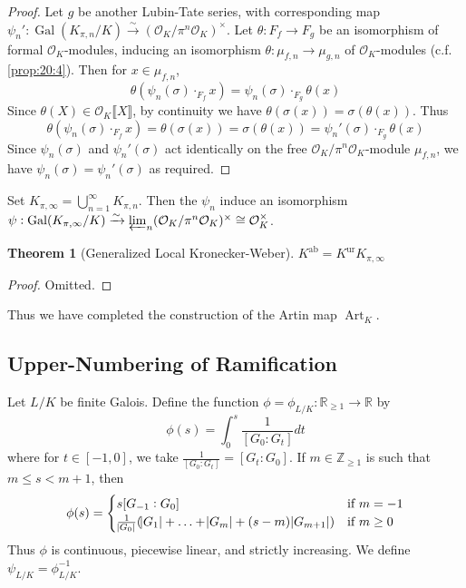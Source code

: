 \documentclass[11pt]{article}
\theoremstyle{definition}
\theoremstyle{plain}
\newtheorem{theorem}[definition]{Theorem}
\theoremstyle{remark}
\DeclareMathOperator{\Gal}{Gal}
\DeclareMathOperator{\Art}{Art}
\newcommand{\ZZ}{\mathbb{Z}}
\newcommand{\RR}{\mathbb{R}}
\newcommand{\cO}{\mathcal{O}}
\newcommand{\ab}{\mathrm{ab}}
\newcommand{\ur}{\mathrm{ur}}
\begin{document}
\begin{proof}
    Let $g$ be another Lubin-Tate series, with corresponding map $\psi_n' : \Gal(K_{\pi,n}/K) \xrightarrow{\sim} (\cO_K / \pi^n \cO_K)^\times$. Let $\theta : F_f \to F_g$ be an isomorphism of formal $\cO_K$-modules, inducing an isomorphism $\theta : \mu_{f,n} \to \mu_{g,n}$ of $\cO_K$-modules (c.f. \autoref{prop:20:4}). Then for $x \in \mu_{f,n}$,
    \begin{equation*}
        \theta(\psi_n(\sigma) \cdot_{F_f} x) = \psi_n(\sigma) \cdot_{F_g} \theta(x)
    \end{equation*}
    Since $\theta(X) \in \cO_K \llbracket X \rrbracket$, by continuity we have $\theta(\sigma(x)) = \sigma(\theta(x))$. Thus
    \begin{equation*}
        \theta(\psi_n(\sigma) \cdot_{F_f} x) = \theta(\sigma(x)) = \sigma(\theta(x)) = \psi_n'(\sigma) \cdot_{F_g} \theta(x)
    \end{equation*}
    Since $\psi_n(\sigma)$ and $\psi_n'(\sigma)$ act identically on the free $\cO_K / \pi^n \cO_K$-module $\mu_{f,n}$, we have $\psi_n(\sigma) = \psi_n'(\sigma)$ as required.
\end{proof}

Set $K_{\pi, \infty} = \bigcup_{n=1}^\infty K_{\pi,n}$. Then the $\psi_n$ induce an isomorphism $\psi : \Gal(K_{\pi,\infty}/K) \xrightarrow{\sim} \varprojlim_n (\cO_K / \pi^n \cO_K)^\times \cong \cO_K^\times$.
\begin{theorem}[Generalized Local Kronecker-Weber]
    $K^\ab = K^\ur K_{\pi, \infty}$
\end{theorem}
\begin{proof}
    Omitted.
\end{proof}

Thus we have completed the construction of the Artin map $\Art_K$.

\subsection{Upper-Numbering of Ramification}

Let $L/K$ be finite Galois. Define the function $\phi = \phi_{L/K} : \RR_{\ge 1} \to \RR$ by
\begin{equation*}
    \phi(s) = \int_0^s \frac{1}{[G_0 : G_t]} dt
\end{equation*}
where for $t \in [-1, 0]$, we take $\frac{1}{[G_0 : G_t]} = [G_t : G_0]$. If $m \in \ZZ_{\ge 1}$ is such that $m \le s < m + 1$, then
\begin{equation*}
    \phi(s) =
    \begin{cases}
        s [G_{-1} : G_0] & \text{if } m = -1\\
        \frac{1}{\abs{G_0}} (\abs{G_1} + \ldots + \abs{G_m} + (s - m) \abs{G_{m+1}}) & \text{if } m \ge 0\\
    \end{cases}
\end{equation*}
Thus $\phi$ is continuous, piecewise linear, and strictly increasing. We define $\psi_{L/K} = \phi_{L/K}^{-1}$.
\end{document}

